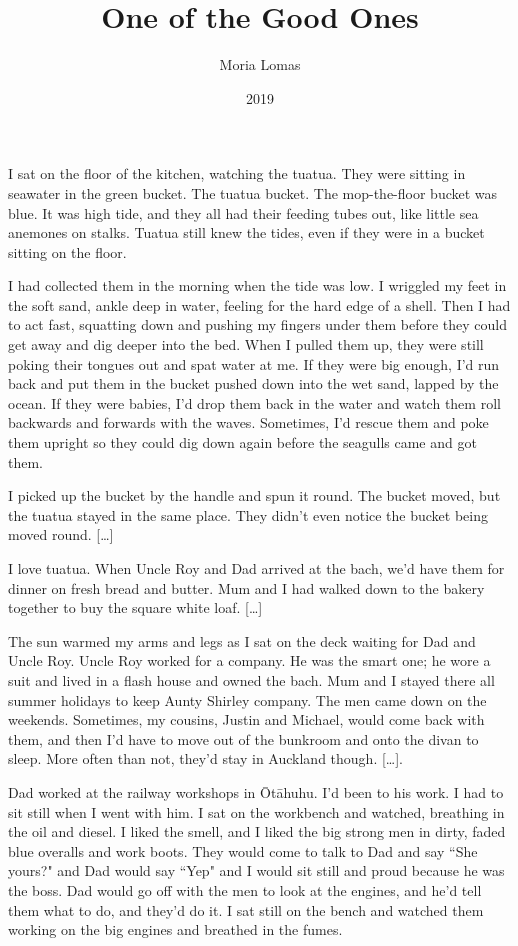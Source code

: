\documentclass[10pt,a4paper]{article}
\newcommand{\qm}[1]{``#1"}
\begin{document}
\title{One of the Good Ones}
\date{2019}
\author{Moria Lomas}

\maketitle

\noindent\linenumbers I sat on the floor of the kitchen, watching the tuatua. They were sitting in seawater in the green bucket. The tuatua bucket. The mop-the-floor bucket was blue. It was high tide, and they all had their feeding tubes out, like little sea anemones on stalks. Tuatua still knew the tides, even if they were in a bucket sitting on the floor.

I had collected them in the morning when the tide was low. I wriggled my feet in the soft sand, ankle deep in water, feeling for the hard edge of a shell. Then I had to act fast, squatting down and pushing my fingers under them before they could get away and dig deeper into the bed. When I pulled them up, they were still poking their tongues out and spat water at me. If they were big enough, I'd run back and put them in the bucket pushed down into the wet sand, lapped by the ocean. If they were babies, I'd drop them back in the water and watch them roll backwards and forwards with the waves. Sometimes, I'd rescue them and poke them upright so they could dig down again before the seagulls came and got them.

I picked up the bucket by the handle and spun it round. The bucket moved, but the tuatua stayed in the same place. They didn't even notice the bucket being moved round. [\ldots]

I love tuatua. When Uncle Roy and Dad arrived at the bach, we'd have them for dinner on fresh bread and butter. Mum and I had walked down to the bakery together to buy the square white loaf. [\ldots]

The sun warmed my arms and legs as I sat on the deck waiting for Dad and Uncle Roy. Uncle Roy worked for a company. He was the smart one; he wore a suit and lived in a flash house and owned the bach. Mum and I stayed there all summer holidays to keep Aunty Shirley company. The men came down on the weekends. Sometimes, my cousins, Justin and Michael, would come back with them, and then I'd have to move out of the bunkroom and onto the divan to sleep. More often than not, they'd stay in Auckland though. [\ldots].

Dad worked at the railway workshops in Ōtāhuhu. I'd been to his work. I had to sit still when I went with him. I sat on the workbench and watched, breathing in the oil and diesel. I liked the smell, and I liked the big strong men in dirty, faded blue overalls and work boots. They would come to talk to Dad and say \qm{She yours?} and Dad would say \qm{Yep} and I would sit still and proud because he was the boss. Dad would go off with the men to look at the engines, and he'd tell them what to do, and they'd do it. I sat still on the bench and watched them working on the big engines and breathed in the fumes.
\end{document}
